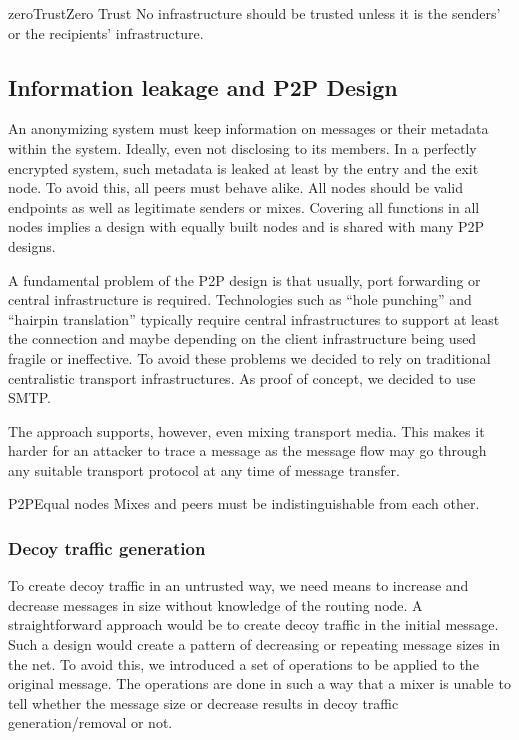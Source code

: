 \begin{requirement}{zeroTrust}{Zero Trust}
	No infrastructure should be trusted unless it is the senders' or the recipients' infrastructure.
\end{requirement}    

\subsection{Information leakage and P2P Design}
An anonymizing system must keep information on messages or their metadata within the system. Ideally, even not disclosing to its members. In a perfectly encrypted system, such metadata is leaked at least by the entry and the exit node. To avoid this, all peers must behave alike. All nodes should be valid endpoints as well as legitimate senders or mixes. Covering all functions in all nodes implies a design with equally built nodes and is shared with many P2P designs.

A fundamental problem of the P2P design is that usually, port forwarding or central infrastructure is required. Technologies such as ``hole punching'' and ``hairpin translation'' typically require central infrastructures to support at least the connection and maybe depending on the client infrastructure being used fragile or ineffective. To avoid these problems we decided to rely on traditional centralistic transport infrastructures. As proof of concept, we decided to use SMTP. 

The approach supports, however, even mixing transport media. This makes it harder for an attacker to trace a message as the message flow may go through any suitable transport protocol at any time of message transfer.

\begin{requirement}{P2P}{Equal nodes}
	Mixes and peers must be indistinguishable from each other. 
\end{requirement}

\subsubsection{Decoy traffic generation}
To create decoy traffic in an untrusted way, we need means to increase and decrease messages in size without knowledge of the routing node. A straightforward approach would be to create decoy traffic in the initial message. Such a design would create a pattern of decreasing or repeating message sizes in the net. To avoid this, we introduced a set of operations to be applied to the original message. The operations are done in such a way that a mixer is unable to tell whether the message size or decrease results in decoy traffic generation/removal or not.


